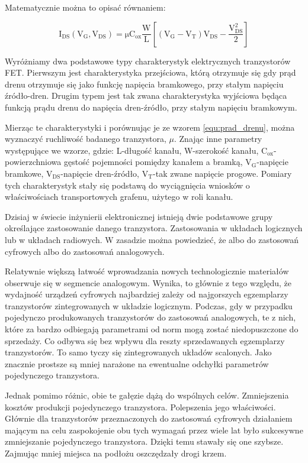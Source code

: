 Matematycznie można to opisać równaniem:

\begin{equation}
    \mathrm{ I_{DS}(V_G, V_{DS}) = \mu C_{ox} \frac{W}{L}[(V_G - V_T)V_{DS} - \frac{V_{DS}^2}{2}]}
	\label{equ:prad_drenu}
\end{equation}

Wyróżniamy dwa podstawowe typy charakterystyk elektrycznych tranzystorów FET. Pierwszym jest charakterystyka przejściowa,
którą otrzymuje się gdy prąd drenu otrzymuje się jako funkcję napięcia bramkowego, przy stałym napięciu źródło-dren. 
Drugim typem jest tak zwana charakterystyka wyjściowa będąca funkcją prądu drenu do napięcia dren-źródło, przy stałym 
napięciu bramkowym.

Mierząc te charakterystyki i porównując je ze wzorem \ref{equ:prad_drenu}, można wyznaczyć ruchliwość badanego tranzystora, $\mu$. 
Znając inne parametry występujące we wzorze, gdzie: L-długość kanału, W-szerokość kanału, 
$\mathrm {C_{ox}}$-powierzchniowa gęstość
 pojemności pomiędzy kanałem a bramką, $\mathrm{ V_G}$-napięcie bramkowe,
 $\mathrm{ V_{DS}}$-napięcie dren-źródło, $\mathrm{ V_T}$-tak zwane napięcie progowe.
Pomiary tych charakterystyk stały się podstawą do wyciągnięcia wniosków o właściwościach transportowych grafenu, użytego
w roli kanału.

Dzisiaj w świecie inżynierii elektronicznej istnieją dwie podstawowe grupy określające zastosowanie danego tranzystora. 
Zastosowania w układach logicznych lub w układach radiowych. W zasadzie można powiedzieć, że albo do zastosowań cyfrowych
albo do zastosowań analogowych. 

Relatywnie większą łatwość wprowadzania nowych technologicznie materiałów obserwuje się w segmencie analogowym. Wynika, to
głównie z tego względu, że wydajność urządzeń cyfrowych najbardziej zależy od najgorszych egzemplarzy tranzystorów 
zintegrowanych w układzie logicznym. Podczas, gdy w przypadku pojedynczo produkowanych tranzystorów do zastosowań analogowych,
te z nich, które za bardzo odbiegają parametrami od norm mogą zostać niedopuszczone do sprzedaży. Co odbywa się bez wpływu
dla reszty sprzedawanych egzemplarzy tranzystorów. To samo tyczy się zintegrowanych układów scalonych. Jako znacznie
prostsze są mniej narażone na ewentualne odchyłki parametrów pojedynczego tranzystora.

Jednak pomimo różnic, obie te gałęzie dążą do wspólnych celów. Zmniejszenia kosztów produkcji pojedynczego tranzystora.
Polepszenia jego właściwości. Głównie dla tranzystorów przeznaczonych do zastosowań cyfrowych działaniem mającym na celu
 zaspokojenie obu tych wymagań przez wiele lat było sukcesywne zmniejszanie pojedynczego tranzystora. Dzięki temu stawały
 się one szybsze. Zajmując mniej miejsca na podłożu oszczędzały drogi krzem.

